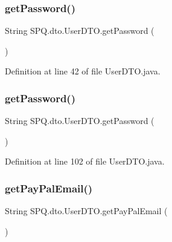 \subsubsection{\texorpdfstring{get\+Password()}{getPassword()}\hspace{0.1cm}{\footnotesize\ttfamily [2/3]}}
{\footnotesize\ttfamily String S\+P\+Q.\+dto.\+User\+D\+T\+O.\+get\+Password (\begin{DoxyParamCaption}{ }\end{DoxyParamCaption})}



Definition at line 42 of file User\+D\+T\+O.\+java.

\mbox{\label{class_s_p_q_1_1dto_1_1_user_d_t_o_a955f436e60336683283a6fcd6fc5f874}} 
\subsubsection{\texorpdfstring{get\+Password()}{getPassword()}\hspace{0.1cm}{\footnotesize\ttfamily [3/3]}}
{\footnotesize\ttfamily String S\+P\+Q.\+dto.\+User\+D\+T\+O.\+get\+Password (\begin{DoxyParamCaption}{ }\end{DoxyParamCaption})}



Definition at line 102 of file User\+D\+T\+O.\+java.

\mbox{\label{class_s_p_q_1_1dto_1_1_user_d_t_o_a42f2eecae334e6e937419b1c201cb1f2}} 
\subsubsection{\texorpdfstring{get\+Pay\+Pal\+Email()}{getPayPalEmail()}}
{\footnotesize\ttfamily String S\+P\+Q.\+dto.\+User\+D\+T\+O.\+get\+Pay\+Pal\+Email (\begin{DoxyParamCaption}{ }\end{DoxyParamCaption})}



